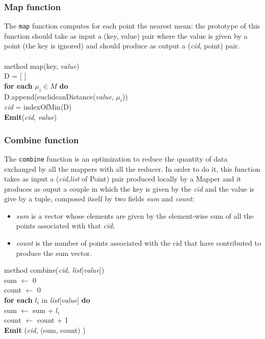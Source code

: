 \documentclass[11pt,a4paper]{article}
\begin{document}
\subsubsection{Map function}\label{sez:map}
The \texttt{map} function computes for each point the nearest mean: the prototype of this function should take as input a (key, value) pair where the value is given by a point (the key is ignored) and should produce as output a (\textit{cid}, point) pair.\\\\
\noindent method map(key, \textit{value})\\
\indent D = [ ]\\
\indent \textbf{for each} $\mu_i \in M$ \textbf{do}\\
\indent\indent D.append(euclideanDistance(\textit{value}, $\mu_i$))\\
\indent \textit{cid} = indexOfMin(D)\\
\indent \textbf{Emit}(\textit{cid}, \textit{value})\\
\subsubsection{Combine function}\label{sez:combine}
The \texttt{combine} function is an optimization to reduce the quantity of data exchanged by all the mappers with all the reducer. In order to do it, this function takes as input a (\textit{cid},\textit{list} of Point) pair produced locally by a Mapper and it produces as ouput a couple in which the key is given by the \textit{cid} and the value is give by a tuple, composed itself by two fields \textit{sum} and \textit{count}:
\begin{itemize}
	\item \textit{sum} is a vector whose elements are given by the element-wise sum of all the points associated with that \textit{cid};
	\item \textit{count} is the number of points associated with the cid that have contributed to produce the sum vector.\\
\end{itemize}

\noindent method combine(\textit{cid, list}[\textit{value}])\\
\indent sum $\leftarrow$ 0\\
\indent count $\leftarrow$ 0\\
\indent \textbf{for each} $l_i$ in \textit{list}[\textit{value}] \textbf{do}\\
\indent\indent sum $\leftarrow$ sum + $l_i$\\
\indent\indent count $\leftarrow$ count + 1\\
\indent \textbf{Emit} (\textit{cid}, (sum, count) )\\
\end{document}
